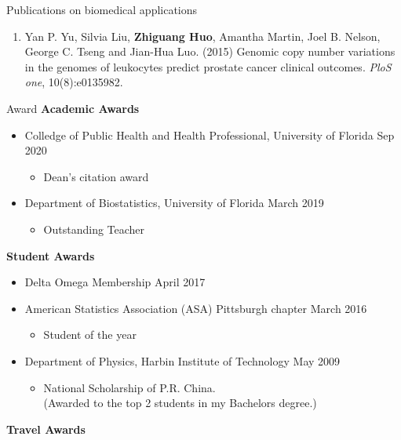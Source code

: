 \documentclass{resume} %
\begin{document}
\begin{rSection}{Publications on biomedical applications}
\begin{enumerate}[noitemsep,topsep=0pt,resume]
    \item Yan P. Yu, Silvia Liu, {\bf Zhiguang Huo}, Amantha Martin, Joel B. Nelson, George C. Tseng and Jian-Hua Luo. (2015) Genomic copy number variations in the genomes of leukocytes predict prostate cancer clinical outcomes. \emph{PloS one}, 10(8):e0135982.

\end{enumerate}


\end{rSection}

\begin{rSection}{Award}
\textbf{Academic Awards}
\begin{itemize}[noitemsep,topsep=0pt]

\item  Colledge of Public Health and Health Professional, University of Florida \hfill Sep 2020
\begin{itemize}[noitemsep,topsep=0pt]
\item Dean's citation award
\end{itemize}

\item  Department of Biostatistics, University of Florida \hfill March 2019
\begin{itemize}[noitemsep,topsep=0pt]
\item Outstanding Teacher
\end{itemize}
\end{itemize}


\textbf{Student Awards}
\begin{itemize}[noitemsep,topsep=0pt]
\item  Delta Omega Membership \hfill April 2017
\item American Statistics Association (ASA) Pittsburgh chapter  \hfill March 2016
\begin{itemize}[noitemsep,topsep=0pt]
\item Student of the year
\end{itemize}
\item Department of Physics, Harbin Institute of Technology \hfill May 2009
\begin{itemize}[noitemsep,topsep=0pt]
\item National Scholarship of P.R. China. \\(Awarded to the top 2 students in my Bachelors degree.)
\end{itemize}
\end{itemize}


\textbf{Travel Awards} 


\end{rSection}
\end{document}
